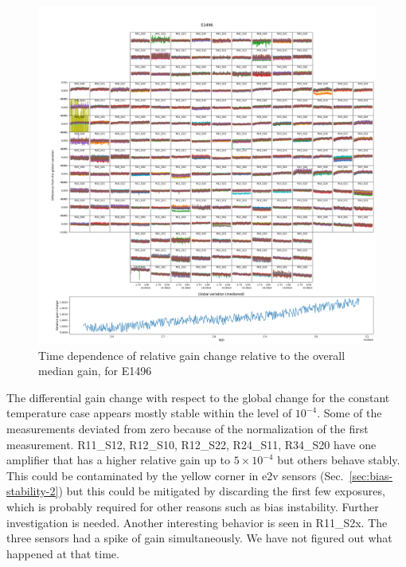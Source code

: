 \begin{figure}[ht]
    \centering
    \includegraphics[width=1\linewidth]{figures/gaintemp/E1496gainoverall_global.png}
    \caption{Time dependence of relative gain change relative to the overall median gain, for E1496}
    \label{fig:relative-gain-E1496}
\end{figure}
The differential gain change with respect to the global change for the constant temperature case appears mostly stable within the level of $10^{-4}$. Some of the measurements deviated from zero because of the normalization of the first measurement. R11\_S12, R12\_S10, R12\_S22, R24\_S11, R34\_S20 have one amplifier that has a higher relative gain up to $5\times 10^{-4}$ but others behave stably. This could be contaminated by the yellow corner in e2v sensors (Sec.~\ref{sec:bias-stability-2}) but this could be mitigated by discarding the first few exposures, which is probably required for other reasons such as bias instability. Further investigation is needed. Another interesting behavior is seen in R11\_S2x. The three sensors had a spike of gain simultaneously. We have not figured out what happened at that time.


